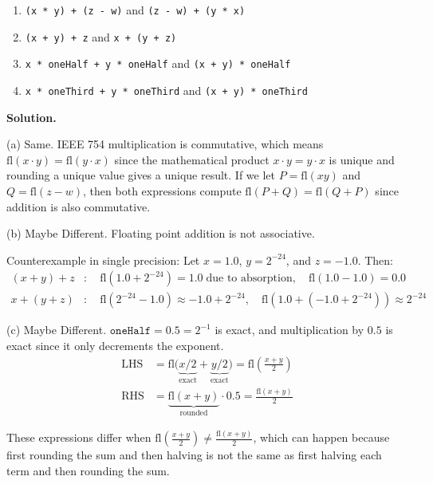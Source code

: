 \documentclass[letterpaper, 11pt]{article}
\newcommand{\1}{\mathds{1}}	%
\newcommand{\fl}{\text{fl}}	%
\theoremstyle{definition}
\begin{document}
\begin{enumerate}[label=(\alph*)]
  \item \texttt{(x * y) + (z - w)} \;\;and\;\; \texttt{(z - w) + (y * x)}
  \item \texttt{(x + y) + z} \;\;and\;\; \texttt{x + (y + z)}
  \item \texttt{x * oneHalf + y * oneHalf} \;\;and\;\; \texttt{(x + y) * oneHalf}
  \item \texttt{x * oneThird + y * oneThird} \;\;and\;\; \texttt{(x + y) * oneThird}
\end{enumerate}

\medskip

\textbf{Solution.}

(a) Same.
IEEE 754 multiplication is commutative, which means $\fl(x \cdot y) = \fl(y \cdot x)$ since the mathematical product $x \cdot y = y \cdot x$ is unique and rounding a unique value gives a unique result. If we let $P = \fl(xy)$ and $Q = \fl(z-w)$, then both expressions compute $\fl(P+Q) = \fl(Q+P)$ since addition is also commutative.

\medskip

(b) Maybe Different.
Floating point addition is not associative.

Counterexample in single precision: Let $x = 1.0$, $y = 2^{-24}$, and $z = -1.0$. Then:
\begin{align*}
(x+y)+z &: \quad \fl(1.0 + 2^{-24}) = 1.0 \;\text{due to absorption}, \quad \fl(1.0 - 1.0) = 0.0 \\
x+(y+z) &: \quad \fl(2^{-24} - 1.0) \approx -1.0 + 2^{-24}, \quad \fl(1.0 + (-1.0 + 2^{-24})) \approx 2^{-24}
\end{align*}

\medskip

(c) Maybe Different.
$\texttt{oneHalf} = 0.5 = 2^{-1}$ is exact, and multiplication by $0.5$ is exact since it only decrements the exponent.
\begin{align*}
\text{LHS} &= \fl\bigl(\underbrace{x/2}_{\text{exact}} + \underbrace{y/2}_{\text{exact}}\bigr) = \fl\!\left(\frac{x+y}{2}\right) \\
\text{RHS} &= \underbrace{\fl(x+y)}_{\text{rounded}} \cdot 0.5 = \frac{\fl(x+y)}{2}
\end{align*}

These expressions differ when $\fl\!\left(\frac{x+y}{2}\right) \neq \frac{\fl(x+y)}{2}$, which can happen because first rounding the sum and then halving is not the same as first halving each term and then rounding the sum.
\end{document}
